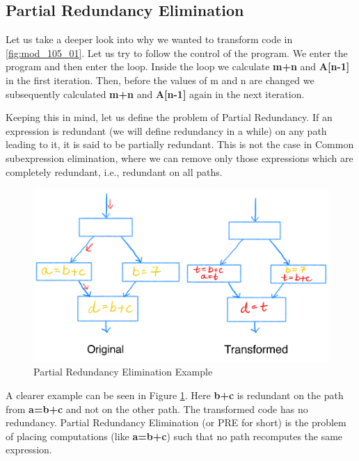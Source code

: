 \subsection{Partial Redundancy Elimination}

Let us take a deeper look into why we wanted to transform code in \ref{fig:mod_105_01}. Let us try to follow the control of the program.
We enter the program and then enter the loop. Inside the loop we calculate \textbf{m+n} and \textbf{A[n-1]} in the first iteration. 
Then, before the values of m and n are changed we subsequently calculated \textbf{m+n} and \textbf{A[n-1]} again in the next iteration. 

Keeping this in mind, let us define the problem of Partial Redundancy. If an expression is redundant (we will 
define redundancy in a while) on any path leading to it, it is said to be partially redundant. This is not the case in Common subexpression
elimination, where we can remove only those expressions which are completely redundant, i.e., redundant on all paths. 

\begin{figure}[h]
\centering
\includegraphics[scale = 0.5]{images/mod_105_fig2.png}
\caption{Partial Redundancy Elimination Example}
\label {fig:mod_105_02}
\end{figure}

A clearer example can be seen in Figure \ref{fig:mod_105_02}. Here \textbf{b+c} is redundant on the path from \textbf{a=b+c} and not on the 
other path. The transformed code has no redundancy. Partial Redundancy Elimination (or PRE for short) is the problem of placing computations (like \textbf{a=b+c}) such that no path recomputes
the same expression.

